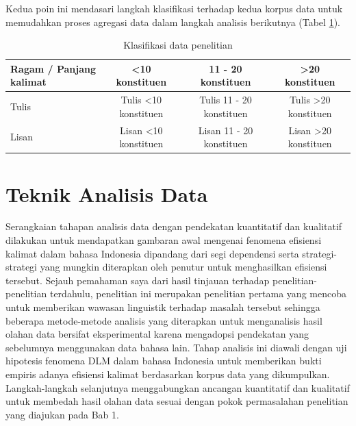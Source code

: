 Kedua poin ini mendasari langkah klasifikasi terhadap kedua korpus data untuk memudahkan proses agregasi data dalam langkah analisis berikutnya (Tabel \ref{tab:tabel_klasifikasi_data}). 

\begin{table}
\begin{footnotesize}
\begin{center}
  \caption{Klasifikasi data penelitian}\label{tab:tabel_klasifikasi_data}
  \begin{tabular}{ | p{3cm} | c | c | c |}
    \hline
    Ragam / Panjang kalimat & \textless 10 konstituen & 11 - 20 konstituen & \textgreater 20 konstituen \\ \hline
    Tulis & Tulis \textless 10 konstituen & Tulis 11 - 20 konstituen & Tulis \textgreater 20 konstituen  \\ \hline
    Lisan & Lisan \textless 10 konstituen & Lisan 11 - 20 konstituen & Lisan \textgreater 20 konstituen \\
    \hline
  \end{tabular}
\end{center}
\end{footnotesize}
\end{table}

\section{Teknik Analisis Data}

Serangkaian tahapan analisis data dengan pendekatan kuantitatif dan kualitatif dilakukan untuk mendapatkan gambaran awal mengenai fenomena efisiensi kalimat dalam bahasa Indonesia dipandang dari segi dependensi serta strategi-strategi yang mungkin diterapkan oleh penutur untuk menghasilkan efisiensi tersebut. Sejauh pemahaman saya dari hasil tinjauan terhadap penelitian-penelitian terdahulu, penelitian ini merupakan penelitian pertama yang mencoba untuk memberikan wawasan linguistik terhadap masalah tersebut sehingga beberapa metode-metode analisis yang diterapkan untuk menganalisis hasil olahan data bersifat eksperimental karena mengadopsi pendekatan yang sebelumnya menggunakan data bahasa lain. Tahap analisis ini diawali dengan uji hipotesis fenomena DLM dalam bahasa Indonesia untuk memberikan bukti empiris adanya efisiensi kalimat berdasarkan korpus data yang dikumpulkan. Langkah-langkah selanjutnya menggabungkan ancangan kuantitatif dan kualitatif untuk membedah hasil olahan data sesuai dengan pokok permasalahan penelitian yang diajukan pada Bab 1.

